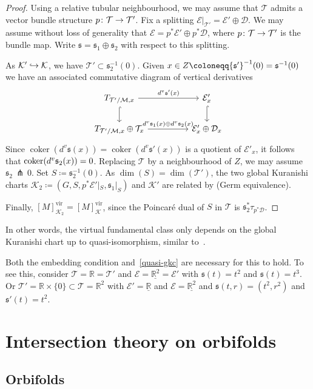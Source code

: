 \documentclass[AHL,Unicode,longabstracts]{cedram}
\newcommand{\sub}{\subset}
\newcommand{\inv}{^{-1}}
\newcommand{\vfc}[1]{[#1]^{\virt}}
\newcommand{\cl}{\colon}
\newcommand{\pf}{\,\pitchfork\,}
\newcommand{\lc}{\underline}
\newcommand{\bR}{\mathbb{R}}
\newcommand{\cD}{\mathcal{D}}
\newcommand{\cE}{\mathcal{E}}
\newcommand{\cK}{\mathcal{K}}
\newcommand{\cM}{\mathcal{M}}
\newcommand{\cT}{\mathcal{T}}
\newcommand{\fs}{\mathfrak{s}}
\DeclareMathOperator{\virt}{vir}
\DeclareMathOperator{\coker}{coker}
\renewcommand*{\to}{\mathchoice{\longrightarrow}{\rightarrow}{\rightarrow}{\rightarrow}}
\newcommand{\longhookrightarrow}{\lhook\joinrel\longrightarrow}
\newcommand*{\hookto}{\mathchoice{\longhookrightarrow}{\hookrightarrow}{\hookrightarrow}{\hookrightarrow}}
\let\oldin\in
\renewcommand{\in}{\mathchoice{\oldin}{\oldin}{\,\oldin\,}{\,\oldin\,}}
\begin{document}
\begin{proof}
Using a relative tubular neighbourhood, we may assume that $\cT$ admits a vector bundle structure $p \cl \cT\to \cT'$. Fix a splitting $\cE|_{\cT'} = \cE'\oplus \cD$. We may assume without loss of generality that $\cE= p^*\cE'\oplus p^*\cD$, where $p \cl \cT\to \cT'$ is the bundle map. Write $\fs = \fs_1\oplus \fs_2$ with respect to this splitting.


As $\cK' \hookto \cK$, we have $\cT'\sub \fs_2\inv(0)$. Given $x \in Z \coloneqq {\fs'}\inv(0) = \fs\inv(0)$ we have an associated commutative diagram of vertical derivatives
\[
\begin{tikzcd}
T_{\cT'/\cM,x} \arrow[rr,"d^v\fs'(x)"] \arrow[d,hook,""]&& \cE'_x \arrow[d,hook,""]\\
T_{\cT'/\cM,x}\oplus \cT_x \arrow[rr,"d^v\fs_1(x)\oplus d^v\fs_2(x)"] && \cE'_x\oplus \cD_x
\end{tikzcd}
\]
Since $\coker(d^v\fs(x)) = \coker(d^v\fs'(x))$ is a quotient of $\cE'_x$, it follows that $\coker(d^v\fs_2(x))\linebreak= 0$. Replacing $\cT$ by a neighbourhood of $Z$, we may assume $\fs_2\pf 0$. Set $S \coloneqq \fs_2\inv(0)$. As $\dim(S) = \dim(\cT')$, the two global Kuranishi charts $\cK_2 \coloneqq (G,S,p^*\cE'|_S,\fs_1|_S)$ and $\cK'$ are related by (Germ equivalence).

Finally, $\vfc{M}_{\cK_2} = \vfc{M}_{\cK}$, since the Poincaré dual of $S$ in $\cT$ is $\fs_2^*\tau_{p^*\cD}$.
\end{proof}

In other words, the virtual fundamental class only depends on the global Kuranishi chart up to quasi-isomorphism, similar to~\cite[Proposition~5.3]{BF97}.

\begin{exam}
Both the embedding condition and~\eqref{quasi-gkc} are necessary for this to hold. To see this, consider $\cT= \bR =\cT'$ and $\cE = \lc{\bR^2} = \cE'$ with $\fs(t) = t^2$ and $\fs(t) = t^3$. Or $\cT' = \bR\times\{0\}\sub \cT =\bR^2$ with $\cE' = \lc{\bR}$ and $\cE = \lc{\bR^2}$ and $\fs(t,r) = (t^2,r^2)$ and $\fs'(t) = t^2$.
\end{exam}


\section{Intersection theory on orbifolds}\label{sec:orbifold-intersection}

\subsection{Orbifolds}
\end{document}
